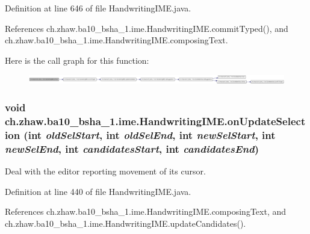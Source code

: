 Definition at line 646 of file HandwritingIME.java.

References ch.zhaw.ba10\_\-bsha\_\-1.ime.HandwritingIME.commitTyped(), and ch.zhaw.ba10\_\-bsha\_\-1.ime.HandwritingIME.composingText.

Here is the call graph for this function:\nopagebreak
\begin{figure}[H]
\begin{center}
\leavevmode
\includegraphics[width=420pt]{classch_1_1zhaw_1_1ba10__bsha__1_1_1ime_1_1HandwritingIME_aaa0fc01a36b17c423c223f0dce23390d_cgraph}
\end{center}
\end{figure}
\hypertarget{classch_1_1zhaw_1_1ba10__bsha__1_1_1ime_1_1HandwritingIME_a372883c8da0f8e41f6acb0d169fc5b6e}{
\subsubsection[{onUpdateSelection}]{\setlength{\rightskip}{0pt plus 5cm}void ch.zhaw.ba10\_\-bsha\_\-1.ime.HandwritingIME.onUpdateSelection (int {\em oldSelStart}, \/  int {\em oldSelEnd}, \/  int {\em newSelStart}, \/  int {\em newSelEnd}, \/  int {\em candidatesStart}, \/  int {\em candidatesEnd})}}
\label{classch_1_1zhaw_1_1ba10__bsha__1_1_1ime_1_1HandwritingIME_a372883c8da0f8e41f6acb0d169fc5b6e}
Deal with the editor reporting movement of its cursor. 

Definition at line 440 of file HandwritingIME.java.

References ch.zhaw.ba10\_\-bsha\_\-1.ime.HandwritingIME.composingText, and ch.zhaw.ba10\_\-bsha\_\-1.ime.HandwritingIME.updateCandidates().

